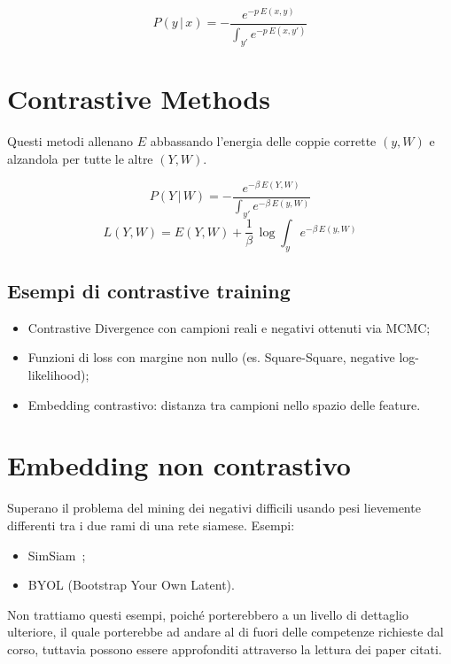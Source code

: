 \begin{equation}
    P(y\,|\,x)= -\frac{e^{-p\,E(x,y)}}{\int_{y'}e^{-p\,E(x,y')}}
\end{equation}

\section{Contrastive Methods}

Questi metodi allenano $E$ abbassando l'energia delle coppie corrette $(y, W)$ e alzandola per tutte le altre $(Y,W)$. 

\begin{equation}
    P(Y\,|\,W)= -\frac{e^{-\beta\,E(Y,W)}}{\int_{y'}e^{-\beta\,E(y,W)}}
\end{equation}
\begin{equation}
    L(Y,W) = E(Y,W) + \frac{1}{\beta}\,\log\int_ye^{-\beta\,E(y,W)}
\end{equation}

\subsection{Esempi di contrastive training}
\begin{itemize}
    \item Contrastive Divergence con campioni reali e negativi ottenuti via MCMC;
    \item Funzioni di loss con margine non nullo (es. Square-Square, negative log-likelihood);
    \item Embedding contrastivo: distanza tra campioni nello spazio delle feature.
\end{itemize}

\section{Embedding non contrastivo}

Superano il problema del mining dei negativi difficili usando pesi lievemente differenti tra i due rami di una rete siamese. Esempi:
\begin{itemize}
    \item SimSiam~\cite{chen2021simsiam};
    \item BYOL (Bootstrap Your Own Latent).
\end{itemize}

Non trattiamo questi esempi, poiché porterebbero a un livello di dettaglio ulteriore, il quale porterebbe ad andare al di fuori delle competenze richieste dal corso, tuttavia possono essere approfonditi attraverso la lettura dei paper citati.

